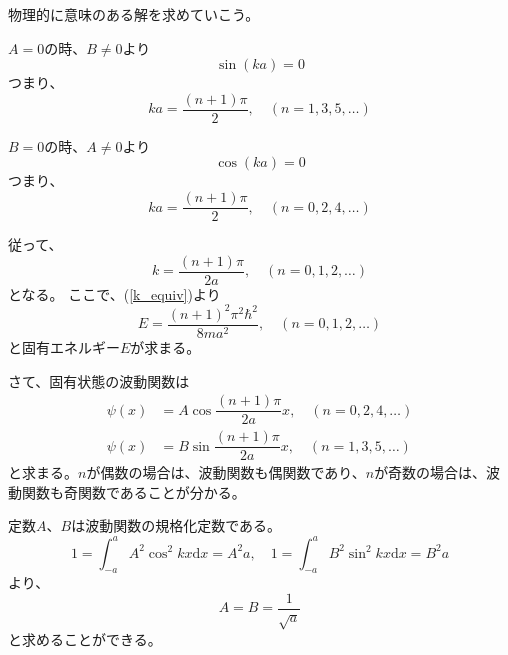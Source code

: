物理的に意味のある解を求めていこう。

$A = 0$の時、$B \neq 0$より
\begin{equation}
	\sin(ka) = 0
\end{equation}
つまり、
\begin{equation}
	ka = \dfrac{(n+1)\pi}{2}, \quad(n = 1, 3, 5, \ldots)
\end{equation}

$B = 0$の時、$A \neq 0$より
\begin{equation}
	\cos(ka) = 0
\end{equation}
つまり、
\begin{equation}
	ka = \dfrac{(n+1)\pi}{2}, \quad(n = 0, 2, 4, \ldots)
\end{equation}

従って、
\begin{equation}
	k = \dfrac{(n+1)\pi}{2a}, \quad(n = 0, 1, 2, \ldots)
\end{equation}
となる。
ここで、(\ref{k_equiv})より
\begin{equation}
	E = \dfrac{(n+1)^2\pi^2\hbar^2}{8ma^2}, \quad(n = 0,1,2,\ldots)
\end{equation}
と固有エネルギー$E$が求まる。

さて、固有状態の波動関数は
\begin{align}
	\psi(x) &= A\cos{\dfrac{(n+1)\pi}{2a}x}, \quad(n = 0, 2, 4, \ldots) \\
	\psi(x) &= B\sin{\dfrac{(n+1)\pi}{2a}x}, \quad(n = 1, 3, 5, \ldots)
\end{align}
と求まる。$n$が偶数の場合は、波動関数も偶関数であり、$n$が奇数の場合は、波動関数も奇関数であることが分かる。

定数$A$、$B$は波動関数の規格化定数である。
\begin{equation}
	1=\int_{-a}^{a} A^{2} \cos ^{2} k x \mathrm{d} x=A^{2} a, \quad
	1=\int_{-a}^{a} B^{2} \sin ^{2} k x \mathrm{d} x=B^{2} a
\end{equation}
より、
\begin{equation}
	A = B = \dfrac{1}{\sqrt{a}}
\end{equation}
と求めることができる。
